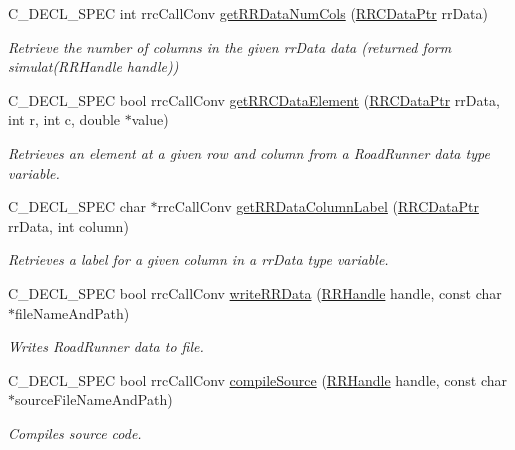 \begin{DoxyCompactItemize}
C\-\_\-\-D\-E\-C\-L\-\_\-\-S\-P\-E\-C int rrc\-Call\-Conv \hyperlink{group__helper_routines_ga76a2e0f7b1704b28ef0b6661b5e6ada9}{get\-R\-R\-Data\-Num\-Cols} (\hyperlink{rrc__types_8h_a9da8b124eb9c3c0045f8926c6a420b4a}{R\-R\-C\-Data\-Ptr} rr\-Data)
\begin{DoxyCompactList}\small\item\em Retrieve the number of columns in the given rr\-Data data (returned form simulat(\-R\-R\-Handle handle)) \end{DoxyCompactList}\item 
C\-\_\-\-D\-E\-C\-L\-\_\-\-S\-P\-E\-C bool rrc\-Call\-Conv \hyperlink{group__helper_routines_gac62debe5a133f63fb3ebe6da3745693c}{get\-R\-R\-C\-Data\-Element} (\hyperlink{rrc__types_8h_a9da8b124eb9c3c0045f8926c6a420b4a}{R\-R\-C\-Data\-Ptr} rr\-Data, int r, int c, double $\ast$value)
\begin{DoxyCompactList}\small\item\em Retrieves an element at a given row and column from a Road\-Runner data type variable. \end{DoxyCompactList}\item 
C\-\_\-\-D\-E\-C\-L\-\_\-\-S\-P\-E\-C char $\ast$rrc\-Call\-Conv \hyperlink{group__helper_routines_gaaa98160597f72e56bf32eff95e7b1f0c}{get\-R\-R\-Data\-Column\-Label} (\hyperlink{rrc__types_8h_a9da8b124eb9c3c0045f8926c6a420b4a}{R\-R\-C\-Data\-Ptr} rr\-Data, int column)
\begin{DoxyCompactList}\small\item\em Retrieves a label for a given column in a rr\-Data type variable. \end{DoxyCompactList}\item 
C\-\_\-\-D\-E\-C\-L\-\_\-\-S\-P\-E\-C bool rrc\-Call\-Conv \hyperlink{group__helper_routines_ga63cba386b98dc030461d2c5e94bdab76}{write\-R\-R\-Data} (\hyperlink{rrc__types_8h_a1d68f0592372208fa5a5f2799ea4b3ae}{R\-R\-Handle} handle, const char $\ast$file\-Name\-And\-Path)
\begin{DoxyCompactList}\small\item\em Writes Road\-Runner data to file. \end{DoxyCompactList}\item 
C\-\_\-\-D\-E\-C\-L\-\_\-\-S\-P\-E\-C bool rrc\-Call\-Conv \hyperlink{group__helper_routines_ga51ea8512eff69dc08b825c209914d11a}{compile\-Source} (\hyperlink{rrc__types_8h_a1d68f0592372208fa5a5f2799ea4b3ae}{R\-R\-Handle} handle, const char $\ast$source\-File\-Name\-And\-Path)
\begin{DoxyCompactList}\small\item\em Compiles source code. \end{DoxyCompactList}\end{DoxyCompactItemize}


